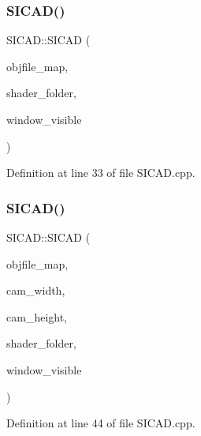 \subsubsection{\texorpdfstring{S\+I\+C\+A\+D()}{SICAD()}\hspace{0.1cm}{\footnotesize\ttfamily [3/9]}}
{\footnotesize\ttfamily S\+I\+C\+A\+D\+::\+S\+I\+C\+AD (\begin{DoxyParamCaption}\item[{const \mbox{\hyperlink{classSICAD_a9e1e1460d4c0f331b4fd015aae4dd721}{Model\+Path\+Container}} \&}]{objfile\+\_\+map,  }\item[{const std\+::string \&}]{shader\+\_\+folder,  }\item[{const bool}]{window\+\_\+visible }\end{DoxyParamCaption})}



Definition at line 33 of file S\+I\+C\+A\+D.\+cpp.

\mbox{\label{classSICAD_a2f0ac6e07e5b0cf7e8a99205bf4bc447}} 
\subsubsection{\texorpdfstring{S\+I\+C\+A\+D()}{SICAD()}\hspace{0.1cm}{\footnotesize\ttfamily [4/9]}}
{\footnotesize\ttfamily S\+I\+C\+A\+D\+::\+S\+I\+C\+AD (\begin{DoxyParamCaption}\item[{const \mbox{\hyperlink{classSICAD_a9e1e1460d4c0f331b4fd015aae4dd721}{Model\+Path\+Container}} \&}]{objfile\+\_\+map,  }\item[{const G\+Lsizei}]{cam\+\_\+width,  }\item[{const G\+Lsizei}]{cam\+\_\+height,  }\item[{const std\+::string \&}]{shader\+\_\+folder,  }\item[{const bool}]{window\+\_\+visible }\end{DoxyParamCaption})}



Definition at line 44 of file S\+I\+C\+A\+D.\+cpp.

\mbox{\label{classSICAD_abebce8e8feb344ad23caed3e2a8b732a}} 
